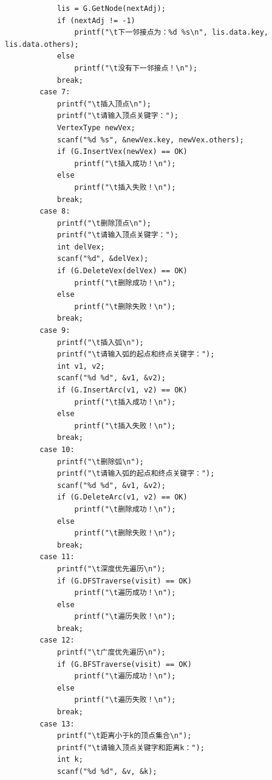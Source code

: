 \documentclass[supercite]{Experimental_Report}
\theoremstyle{definition}
\begin{document}
\begin{lstlisting}
            lis = G.GetNode(nextAdj);
            if (nextAdj != -1)
                printf("\t下一邻接点为：%d %s\n", lis.data.key, lis.data.others);
            else
                printf("\t没有下一邻接点！\n");
            break;
        case 7:
            printf("\t插入顶点\n");
            printf("\t请输入顶点关键字：");
            VertexType newVex;
            scanf("%d %s", &newVex.key, newVex.others);
            if (G.InsertVex(newVex) == OK)
                printf("\t插入成功！\n");
            else
                printf("\t插入失败！\n");
            break;
        case 8:
            printf("\t删除顶点\n");
            printf("\t请输入顶点关键字：");
            int delVex;
            scanf("%d", &delVex);
            if (G.DeleteVex(delVex) == OK)
                printf("\t删除成功！\n");
            else
                printf("\t删除失败！\n");
            break;
        case 9:
            printf("\t插入弧\n");
            printf("\t请输入弧的起点和终点关键字：");
            int v1, v2;
            scanf("%d %d", &v1, &v2);
            if (G.InsertArc(v1, v2) == OK)
                printf("\t插入成功！\n");
            else
                printf("\t插入失败！\n");
            break;
        case 10:
            printf("\t删除弧\n");
            printf("\t请输入弧的起点和终点关键字：");
            scanf("%d %d", &v1, &v2);
            if (G.DeleteArc(v1, v2) == OK)
                printf("\t删除成功！\n");
            else
                printf("\t删除失败！\n");
            break;
        case 11:
            printf("\t深度优先遍历\n");
            if (G.DFSTraverse(visit) == OK)
                printf("\t遍历成功！\n");
            else
                printf("\t遍历失败！\n");
            break;
        case 12:
            printf("\t广度优先遍历\n");
            if (G.BFSTraverse(visit) == OK)
                printf("\t遍历成功！\n");
            else
                printf("\t遍历失败！\n");
            break;
        case 13:
            printf("\t距离小于k的顶点集合\n");
            printf("\t请输入顶点关键字和距离k：");
            int k;
            scanf("%d %d", &v, &k);


\end{lstlisting}
\end{document}
